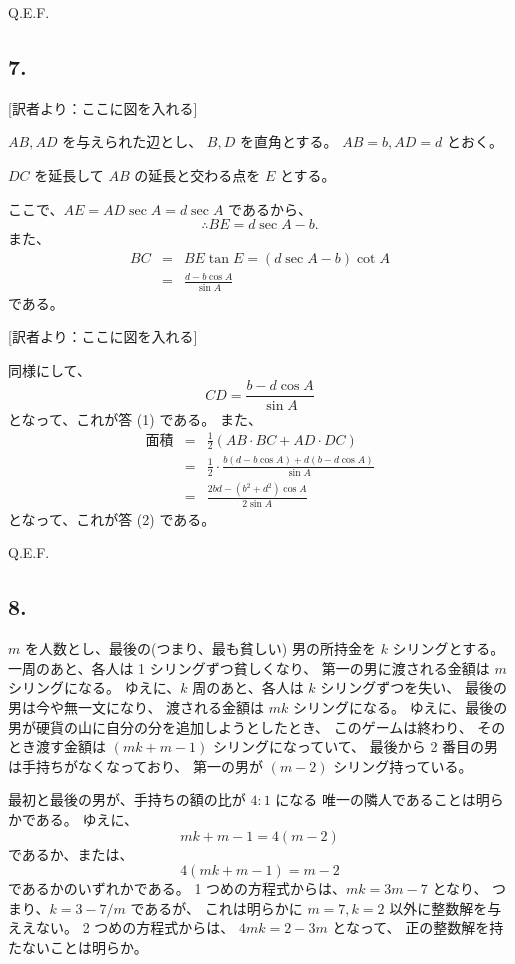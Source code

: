 Q.E.F.

\subsection*{7.}

[訳者より：ここに図を入れる]

$AB, AD$ を与えられた辺とし、
$B, D$ を直角とする。
$AB = b, AD = d$ とおく。

$DC$ を延長して $AB$ の延長と交わる点を $E$ とする。

ここで、$AE = AD \sec A = d \sec A$ であるから、
\[
\therefore BE = d \sec A - b.
\]
また、
\begin{eqnarray*}
BC &=& BE \tan E = (d \sec A - b) \cot A\\
 &=& \frac{d - b\cos A}{\sin A}
\end{eqnarray*}
である。

[訳者より：ここに図を入れる]

同様にして、
\[
CD = \frac{b - d \cos A}{\sin A}
\]
となって、これが答 (1) である。
また、
\begin{eqnarray*}
\mbox{面積}
&=& \frac{1}{2} (AB \cdot BC + AD \cdot DC)\\
&=&  \frac{1}{2} \cdot \frac{b(d - b \cos A) + d(b - d \cos A)}{\sin A}\\
&=& \frac{2bd - (b^2 + d^2) \cos A}{2 \sin A}
\end{eqnarray*}
となって、これが答 (2) である。

Q.E.F.

\subsection*{8.}

$m$ を人数とし、最後の(つまり、最も貧しい)
男の所持金を $k$ シリングとする。
一周のあと、各人は 1 シリングずつ貧しくなり、
第一の男に渡される金額は $m$ シリングになる。
ゆえに、$k$ 周のあと、各人は $k$ シリングずつを失い、
最後の男は今や無一文になり、
渡される金額は $mk$ シリングになる。
ゆえに、最後の男が硬貨の山に自分の分を追加しようとしたとき、
このゲームは終わり、
そのとき渡す金額は $(mk + m -1)$ シリングになっていて、
最後から 2 番目の男は手持ちがなくなっており、
第一の男が $(m-2)$ シリング持っている。

最初と最後の男が、手持ちの額の比が $4: 1$ になる
唯一の隣人であることは明らかである。
ゆえに、
\[
mk + m - 1 = 4(m-2)
\]
であるか、または、
\[
4(mk + m - 1) = m -2
\]
であるかのいずれかである。
 1 つめの方程式からは、$mk = 3m - 7$ となり、
つまり、$k = 3 - 7/m$ であるが、
これは明らかに $m = 7, k = 2$ 以外に整数解を与ええない。
 2 つめの方程式からは、
$4mk = 2 - 3m$ となって、
正の整数解を持たないことは明らか。

